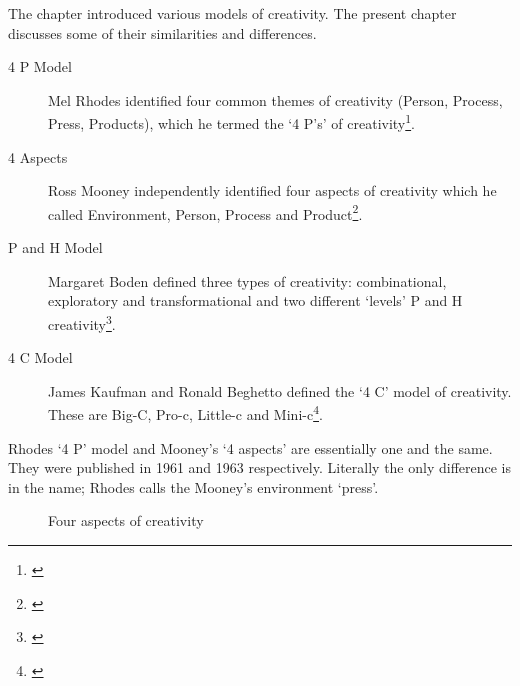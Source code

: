 The  chapter introduced various models of creativity. The present chapter discusses some of their similarities and differences.

\begin{description}
  \item [4 P Model] Mel Rhodes identified four common themes of creativity (Person, Process, Press, Products), which he termed the `4 P\rq s' of creativity\footnote{\autocite{Rhodes1961}}.
  \item [4 Aspects] Ross Mooney independently identified four aspects of creativity which he called Environment, Person, Process and Product\footnote{\autocite[as cited in][]{Sternberg1999}}.
  \item [P and H Model] Margaret Boden defined three types of creativity: combinational, exploratory and transformational and two different `levels' P and H creativity\footnote{\autocite{Boden2003}}.
  \item [4 C Model] James Kaufman and Ronald Beghetto defined the `4 C' model of creativity. These are Big-C, Pro-c, Little-c and Mini-c\footnote{\autocite{Kaufman2009}}.
\end{description}

Rhodes `4 P' model and Mooney's `4 aspects' are essentially one and the same. They were published in 1961 and 1963 respectively. Literally the only difference is in the name; Rhodes calls the Mooney's environment `press'.

\begin{figure}[!htbp] %
  \centering
  \tikzset{every fit/.append style=text badly centered}
\caption[Four aspects of creativity]{Four aspects of creativity}
\label{fig:4Crea}
\end{figure}

